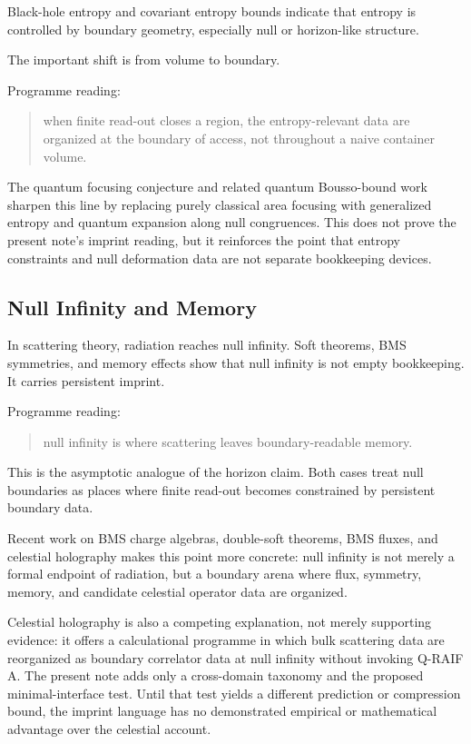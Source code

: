 \documentclass[12pt,a4paper]{article}
\theoremstyle{definition}
\theoremstyle{remark}
\begin{document}
Black-hole entropy and covariant entropy bounds indicate that entropy is
controlled by boundary geometry, especially null or horizon-like
structure.

The important shift is from volume to boundary.

Programme reading:

\begin{quote}
when finite read-out closes a region, the entropy-relevant data are
organized at the boundary of access, not throughout a naive container
volume.
\end{quote}

The quantum focusing conjecture and related quantum Bousso-bound work
sharpen this line by replacing purely classical area focusing with
generalized entropy and quantum expansion along null congruences. This
does not prove the present note's imprint reading, but it reinforces the
point that entropy constraints and null deformation data are not
separate bookkeeping devices.

\subsection{Null Infinity and
Memory}\label{null-infinity-and-memory}

In scattering theory, radiation reaches null infinity. Soft theorems,
BMS symmetries, and memory effects show that null infinity is not empty
bookkeeping. It carries persistent imprint.

Programme reading:

\begin{quote}
null infinity is where scattering leaves boundary-readable memory.
\end{quote}

This is the asymptotic analogue of the horizon claim. Both cases treat
null boundaries as places where finite read-out becomes constrained by
persistent boundary data.

Recent work on BMS charge algebras, double-soft theorems, BMS fluxes,
and celestial holography makes this point more concrete: null infinity
is not merely a formal endpoint of radiation, but a boundary arena where
flux, symmetry, memory, and candidate celestial operator data are
organized.

Celestial holography is also a competing explanation, not merely supporting evidence: it offers a calculational programme in which bulk scattering data are reorganized as boundary correlator data at null infinity without invoking Q-RAIF A.  The present note adds only a cross-domain taxonomy and the proposed minimal-interface test.  Until that test yields a different prediction or compression bound, the imprint language has no demonstrated empirical or mathematical advantage over the celestial account.
\end{document}
